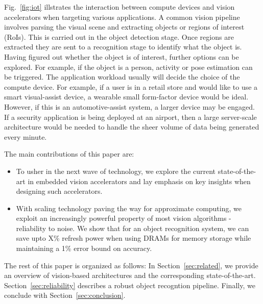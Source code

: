 Fig.~\ref{fig:iot} illstrates the interaction between compute devices and vision accelerators when targeting various applications. A common vision pipeline involves parsing the visual scene and extracting objects or regions of interest (RoIs). This is 
carried out in the object detection stage. Once regions are extracted they are sent to a recognition stage to identify 
what the object is. Having figured out whether the object is of interest, further options can be explored. For example, if the 
object is a person, activity or pose estimation can be triggered. The application workload usually will decide the choice of 
the compute device. For example, if a user is in a retail store and would like to use a smart visual-assist device, a 
wearable small form-factor device would be ideal. However, if this is an automotive-assist system, a larger device may be 
engaged. If a security application is being deployed at an airport, then a large server-scale architecture would be needed to
handle the sheer volume of data being generated every minute.

The main contributions of this paper are:
\begin{itemize}
\item To usher in the next wave of technology, we explore the current state-of-the-art in 
embedded vision accelerators and lay emphasis on key insights when designing such accelerators.
\item With scaling technology paving the way for approximate computing, we exploit an increasingly powerful property of most vision algorithms - reliability to noise. 
We show that for an object recognition system, we can save upto X\% refresh power when using DRAMs for memory storage while maintaining a 1\% error bound on accuracy.
\end{itemize}

The rest of this paper is organized as follows:
In Section~\ref{sec:related}, we provide an overview of vision-based architectures and the corresponding state-of-the-art.
Section~\ref{sec:reliability} describes a robust object recogntion pipeline.
Finally, we conclude with Section~\ref{sec:conclusion}.

